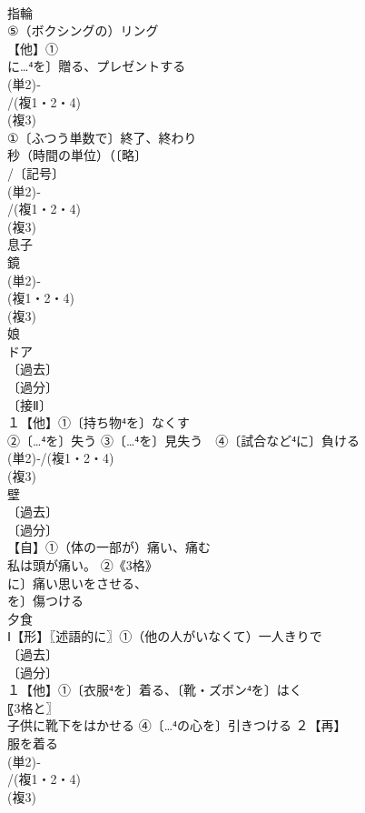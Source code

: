 \documentclass[8pt]{extreport}
\begin{document}
\begin{CJK}{UTF8}{min}
\\	指輪
\\	⑤（ボクシングの）リング
\\	【他】①
\\	に…⁴を〕贈る、プレゼントする
\\	(単2)‐
\\	/(複1・2・4)
\\	(複3)
\\	①〔ふつう単数で〕終了、終わり
\\	秒（時間の単位）（〔略〕
\\	/〔記号〕
\\	(単2)‐
\\	/(複1・2・4)
\\	(複3)
\\	息子
\\	鏡 
\\	(単2)‐ 
\\	(複1・2・4)
\\	(複3)
\\	娘 
\\	ドア
\\	〔過去〕
\\	〔過分〕
\\	〔接Ⅱ〕
\\	１【他】①〔持ち物⁴を〕なくす
\\	②〔…⁴を〕失う ③〔…⁴を〕見失う　④〔試合など⁴に〕負ける
\\	(単2)‐/(複1・2・4)
\\	(複3)
\\	壁
\\	〔過去〕
\\	〔過分〕
\\	【自】①（体の一部が）痛い、痛む 
\\	私は頭が痛い。 ②《3格》
\\	に〕痛い思いをさせる、
\\	を〕傷つける
\\	夕食 
\\	Ⅰ【形】〖述語的に〗①（他の人がいなくて）一人きりで 
\\	〔過去〕
\\	〔過分〕
\\	１【他】①〔衣服⁴を〕着る、〔靴・ズボン⁴を〕はく
\\	〖3格と〗
\\	子供に靴下をはかせる ④〔…⁴の心を〕引きつける ２【再】
\\	服を着る
\\	(単2)‐
\\	/(複1・2・4)
\\	(複3)

\end{CJK}
\end{document}
